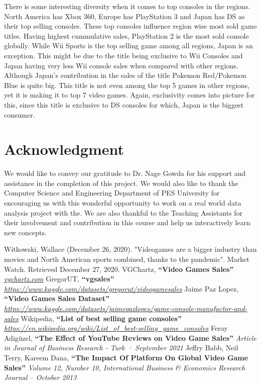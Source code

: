 \documentclass[conference]{IEEEtran}
\begin{document}
There is some interesting diversity when it comes to top consoles in the regions. North America has Xbox 360, Europe has PlayStation 3 and Japan has DS as their top selling consoles. These top consoles influence region wise most sold game titles. Having highest cummulative sales, PlayStation 2 is the most sold console globally. While Wii Sports is the top selling game among all regions, Japan is an exception. This might be due to the title being exclusive to Wii Consoles and Japan having very less Wii console sales when compared with other regions. Although Japan's contribution in the sales of the title Pokemon Red/Pokemon Blue is quite big. This title is not even among the top 5 games in other regions, yet it is making it to top 7 video games. Again, exclusivity comes into picture for this, since this title is exclusive to DS consoles for which, Japan is the biggest consumer.

\section{Acknowledgment}
We would like to convey our gratitude to Dr. Nage Gowda for his support and assistance in the completion of this project. We would also like to thank the Computer Science and Engineering Department of PES University for encouraging us with this wonderful opportunity to work on a real world data analysis project with the. We are also thankful to the Teaching Assistants for their involvement and contribution in this course and help us interactively learn new concepts.

\begin{thebibliography}{00}
     Witkowski, Wallace (December 26, 2020). "Videogames are a bigger industry than movies and North American sports combined, thanks to the pandemic". Market Watch. Retrieved December 27, 2020.
     VGChartz, \textbf{``Video Games Sales''} \textit{\url{vgchartz.com}}
     GregorUT, \textbf{``vgsales''} \textit{\url{https://www.kaggle.com/datasets/gregorut/videogamesales}}
     Jaime Paz Lopez, \textbf{``Video Games Sales Dataset''} \textit{\url{https://www.kaggle.com/datasets/jaimepazlopes/game-console-manufactor-and-sales}}
     Wikipedia, \textbf{``List of best selling game consoles''} \textit{\url{https://en.wikipedia.org/wiki/List_of_best-selling_game_consoles}}
     Feray Adigüzel, \textbf{``The Effect of YouTube Reviews on Video Game Sales''} \textit{Article  in  Journal of Business Research - Turk · September 2021}
     Jeffry Babb, Neil Terry, Kareem Dana, \textbf{``The Impact Of Platform On Global Video Game Sales''} \textit{Volume 12, Number 10, International Business \& Economics Research Journal – October 2013}

\end{thebibliography}
\end{document}

